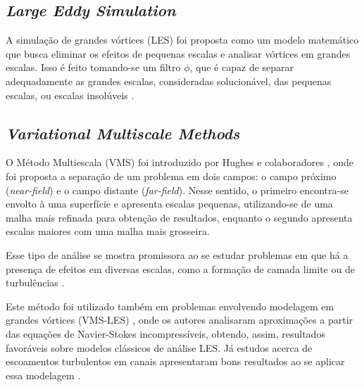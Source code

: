 \documentclass[_ArquivoPrincipal.tex]{subfiles}
\begin{document}
\subsection{\textit{Large Eddy Simulation}} \label{LES}

A simulação de grandes vórtices (LES) foi proposta como um modelo matemático que busca eliminar os efeitos de pequenas escalas e analisar vórtices em grandes escalas. Isso é feito tomando-se um filtro $\phi$, que é capaz de separar adequadamente as grandes escalas, consideradas solucionável, das pequenas escalas, ou escalas insolúveis \cite{hughes2000large}.

\subsection{\textit{Variational Multiscale Methods}} \label{VMS}

O Método Multiescala (VMS) foi introduzido por Hughes e colaboradores \cite{hughes1995multiscale, hughes1996space, hughes1998variational}, onde foi proposta a separação de um problema em dois campos: o campo próximo (\textit{near-field}) e o campo distante (\textit{far-field}). Nesse sentido, o primeiro encontra-se envolto à uma superfície e apresenta escalas pequenas, utilizando-se de uma malha mais refinada para obtenção de resultados, enquanto o segundo apresenta escalas maiores com uma malha mais grosseira.

Esse tipo de análise se mostra promissora ao se estudar problemas em que há a presença de efeitos em diversas escalas, como a formação de camada limite ou de turbulências \cite{fernandes2020tecnica}.

Este método foi utilizado também em problemas envolvendo modelagem em grandes vórtices (VMS-LES) \cite{hughes2000large, bazilevs2007variational}, onde os autores analisaram aproximações a partir das equações de Navier-Stokes incompressíveis, obtendo, assim, resultados favoráveis sobre modelos clássicos de análise LES. Já estudos acerca de escoamentos turbulentos em canais apresentaram bons resultados ao se aplicar essa modelagem \cite{hughes2002variational}.

\end{document}
